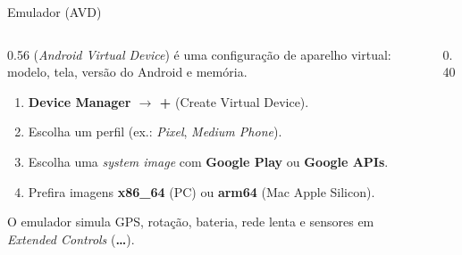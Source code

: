 \documentclass[aspectratio=169,10pt]{beamer}
\begin{document}
\begin{frame}{Emulador (AVD)}
  \begin{columns}[T]
    \begin{column}{0.56\textwidth}
      \small
       (\emph{Android Virtual Device}) é uma configuração de aparelho virtual: modelo, tela, versão do Android e memória.
      \begin{enumerate}
        \item \textbf{Device Manager $\rightarrow$ +} (Create Virtual Device).
        \item Escolha um perfil (ex.: \emph{Pixel}, \emph{Medium Phone}).
        \item Escolha uma \emph{system image} com \textbf{Google Play} ou \textbf{Google APIs}.
        \item Prefira imagens \textbf{x86\_64} (PC) ou \textbf{arm64} (Mac Apple Silicon).
      \end{enumerate}
      \begin{dica}
        O emulador simula GPS, rotação, bateria, rede lenta e sensores em \emph{Extended Controls} (\textbf{\ldots}).
      \end{dica}
    \end{column}
    \begin{column}{0.40\textwidth}
      \centering
    \end{column}
  \end{columns}
\end{frame}
\end{document}
